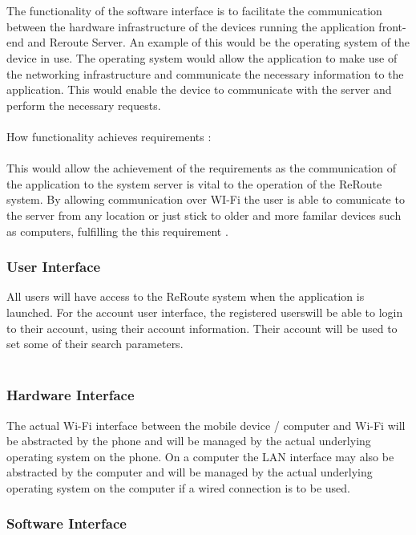 \documentclass[a4paper,10pt]{article}
\begin{document}
{\\\\
The functionality of the software interface is to facilitate the communication between the hardware infrastructure of the devices running the application front-end and Reroute Server. An example of this would be the operating system of the device in use. The operating system would allow the application to make use of the networking infrastructure and communicate the necessary information to the application. This would enable the device to communicate with the server and perform the necessary requests.
\\\\
How functionality achieves requirements :
\\\\
This would allow the achievement of the requirements as the communication of the application to the system server is vital to the operation of the ReRoute system. By allowing communication over WI-Fi the user is able to comunicate to the server from any location  or just stick to older and more familar devices such as computers, fulfilling the this requirement .}

		
            \subsubsection{User Interface}
	    {All users will have access to the ReRoute system when the application is launched.
For the account user interface, the registered userswill be able to login to their account, using their account information.
Their account will be used to set some of their search parameters.\\\\
}

\subsubsection{Hardware Interface}
		{
The actual Wi-Fi interface between the mobile device / computer and Wi-Fi will be abstracted by the phone and will be managed by the actual underlying operating system on the phone. On a computer the LAN interface may also be abstracted by the computer and will be managed by the actual underlying operating system on the computer if a wired connection is to be used.}
            \subsubsection{Software Interface}
\end{document}
